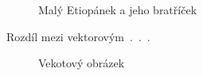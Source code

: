 \documentclass[a4paper, 11pt, times]{article}
\begin{document}
\begin{figure}[h]
\begin{center}
{     }
\caption{Malý Etiopánek a jeho bratříček}
\label{fig:africa}
\end{center}
\end{figure}


Rozdíl mezi vektorovým\ .\ .\ .
\begin{figure}[h]
\begin{center}
\caption{Vekotový obrázek}
\label{fig:vector}
\end{center}
\end{figure}
\end{document}
